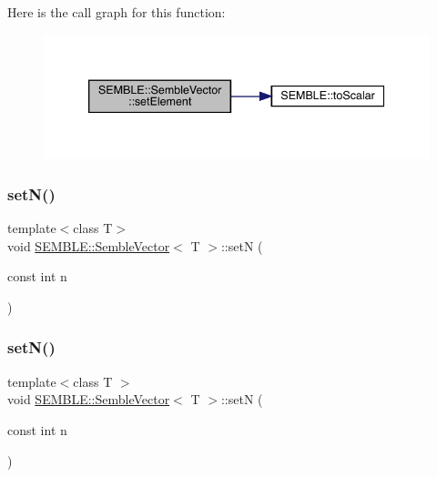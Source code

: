 Here is the call graph for this function\+:
\nopagebreak
\begin{figure}[H]
\begin{center}
\leavevmode
\includegraphics[width=339pt]{d9/d94/structSEMBLE_1_1SembleVector_a0eeec0b9e7992933a309dde7b0d92b05_cgraph}
\end{center}
\end{figure}
\mbox{\label{structSEMBLE_1_1SembleVector_a7ca12dcc693c8395ddd4ec544330db82}} 
\subsubsection{\texorpdfstring{setN()}{setN()}\hspace{0.1cm}{\footnotesize\ttfamily [1/2]}}
{\footnotesize\ttfamily template$<$class T$>$ \\
void \mbox{\hyperlink{structSEMBLE_1_1SembleVector}{S\+E\+M\+B\+L\+E\+::\+Semble\+Vector}}$<$ T $>$\+::setN (\begin{DoxyParamCaption}\item[{const int}]{n }\end{DoxyParamCaption})}

\mbox{\label{structSEMBLE_1_1SembleVector_a7ca12dcc693c8395ddd4ec544330db82}} 
\subsubsection{\texorpdfstring{setN()}{setN()}\hspace{0.1cm}{\footnotesize\ttfamily [2/2]}}
{\footnotesize\ttfamily template$<$class T $>$ \\
void \mbox{\hyperlink{structSEMBLE_1_1SembleVector}{S\+E\+M\+B\+L\+E\+::\+Semble\+Vector}}$<$ T $>$\+::setN (\begin{DoxyParamCaption}\item[{const int}]{n }\end{DoxyParamCaption})}

